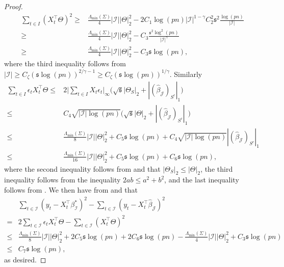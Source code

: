 \documentclass[11pt]{article}
\newcommand{\I}{{\mathcal I }}
\newcommand{\J}{{  \mathcal J } }
\newcommand{\s}{ { \mathfrak{s}  } }
\theoremstyle{plain}
\theoremstyle{definition}
\begin{document}
\begin{proof}
\begin{align} \nonumber 
		   \sum_{t \in I} (X_t^{\top} \Theta  )^2  
		\geq  &  \frac{\Lambda_{\min} (\Sigma) }{4}   |\I|  |\Theta  |_2 ^2 - 2C_1   \log(pn)  |\I|^{1-\gamma }C_2^2   \s^2 \frac{\log(pn) }{|\I| }  
		\\\nonumber  
		\ge &  \frac{\Lambda_{\min} (\Sigma) }{4}   |\I|  |\Theta  |_2 ^2   -C_3  \frac{ \s^2 \log^2 (pn) }{|\I|^\gamma  }  
		\\
		\ge &   \frac{\Lambda_{\min} (\Sigma) }{4}   |\I|  |\Theta  |_2 ^2   -C_3    \s  \log  (pn)  \label{eq-lem16-pf-1},
	\end{align}  
	where the third inequality follows from $| \I | \ge  C_\zeta ( \s \log(pn) )^{2/\gamma -1 } \ge  C_\zeta(\s\log(pn) )^{1/\gamma}$. Similarly 
	\begin{align}\nonumber 
	  \sum_{t \in I} \epsilon_t X_t^{\top}\Theta  
	\leq & 2  \bigg |\sum_{t \in I }  X_t \epsilon_t   \bigg |_{\infty }  \bigg (   \sqrt {\s } | \Theta _S |_2  + |(\widehat \beta_\J)_{S^c} |_1  \bigg)   
	\\\nonumber 
	\le & C_4 \sqrt {|\I|   \log(pn)  }  \bigg (   \sqrt {\s } | \Theta   |_2  + | (\widehat \beta_\J)_{S^c} |_1  \bigg)   
	\\\nonumber 
	\le 
	&  \frac{\Lambda_{\min}(\Sigma) }{8} |\I| | \Theta|_2^2  +C_5  \s\log(pn) + C_4 \sqrt {|\I|   \log(pn)  }   |(\widehat \beta_\J)_{S^c} |_1  
	\\
	\le & \frac{\Lambda_{\min}(\Sigma) }{16} |\I| | \Theta|_2^2  +C_5  \s\log(pn) + C_6\s\log(pn),\label{eq-lem16-pf-2} 
	\end{align} 
	where the second inequality follows from  and that $|\Theta_S|_2 \le |\Theta|_2$, the third inequality follows from the inequality $2ab \leq a^2 + b^2$, and the last inequality follows from  . 
	 We then have from  and  that 
	\begin{align*}
	& \sum_{t \in \I} (y_t - X _t^{\top} \beta^*_\I)^2 - \sum_{t \in \I} (y_t - X_t^{\top} \widehat{\beta} _\J)^2 
	\\  =&  2 \sum_{t \in \I} \epsilon_t X_t^{\top}\Theta  - \sum_{t \in \I} (X_t^{\top}\Theta )^2 \\
	\leq & \frac{\Lambda_{\min}(\Sigma) }{8} |\I| | \Theta|_2^2  + 2 C_5  \s\log(pn) + 2 C_6\s\log(pn) - \frac{\Lambda_{\min} (\Sigma) }{4}   |\I|  |\Theta  |_2 ^2   +C_3    \s  \log  (pn) 
	\\
	\le &  C_7 \s\log(pn),
	\end{align*}
	 as desired. 
\end{proof} 
\end{document}
